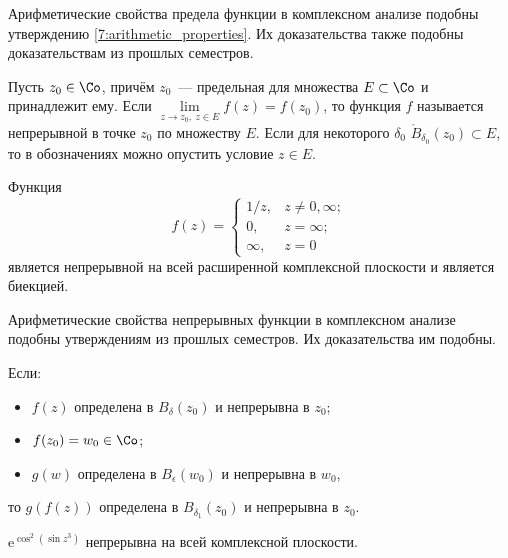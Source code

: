 \begin{note}
Арифметические свойства предела функции в комплексном анализе подобны утверждению
\ref{7:arithmetic_properties}. Их доказательства также подобны доказательствам из прошлых семестров.
\end{note}

\begin{definition}
Пусть \(z_0 \in \Co\), причём \(z_0\)~--- предельная для множества \(E \subset \Co\) и принадлежит
ему. Если \(\lim\limits_{z \to z_0, \ z \in E} f(z) = f(z_0)\), то функция \(f\) называется
непрерывной в точке \(z_0\) по множеству \(E\). Если для некоторого \(\delta_0\)
\(\mathring{B}_{\delta_0} (z_0) \subset E\), то в обозначениях можно опустить условие \(z \in E\).
\end{definition}

\begin{example}
Функция
\begin{equation*}
    f(z) =
        \begin{cases}
            1/z, & z \neq 0, \infty; \\
            0, & z = \infty; \\
            \infty, & z = 0
        \end{cases}
\end{equation*}
является непрерывной на всей расширенной комплексной плоскости и является биекцией.
\end{example}

\begin{note}
Арифметические свойства непрерывных функции в комплексном анализе подобны утверждениям из прошлых
семестров. Их доказательства им подобны.
\end{note}

\begin{statement}
Если:
\begin{itemize}
\item \(f(z)\) определена в \(B_\delta (z_0)\) и непрерывна в \(z_0\);
\item \(f(z_0) = w_0 \in \Co\);
\item \(g(w)\) определена в \(B_\epsilon (w_0)\) и непрерывна в \(w_0\),
\end{itemize}
то \(g(f(z))\) определена в \(B_{\delta_1} (z_0)\) и непрерывна в \(z_0\).
\end{statement}

\begin{example}
\(\text{e}^{\cos^2{(\sin{z^3})}}\) непрерывна на всей комплексной плоскости.
\end{example}

